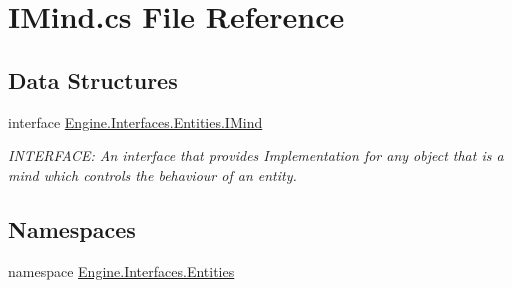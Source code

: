 \hypertarget{a00116}{}\section{I\+Mind.\+cs File Reference}
\label{a00116}
\subsection*{Data Structures}
\begin{DoxyCompactItemize}
\item 
interface \hyperlink{a00446}{Engine.\+Interfaces.\+Entities.\+I\+Mind}
\begin{DoxyCompactList}\small\item\em I\+N\+T\+E\+R\+F\+A\+CE\+: An interface that provides Implementation for any object that is a mind which controls the behaviour of an entity. \end{DoxyCompactList}\end{DoxyCompactItemize}
\subsection*{Namespaces}
\begin{DoxyCompactItemize}
\item 
namespace \hyperlink{a00259}{Engine.\+Interfaces.\+Entities}
\end{DoxyCompactItemize}
